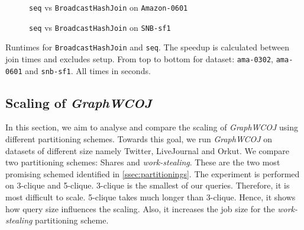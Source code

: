 \begin{figure}
    \centering
    
    \caption{\texttt{seq} vs \texttt{BroadcastHashJoin} on \texttt{Amazon-0601}}
    \label{fig:seq-bar-ama-0601}
\end{figure}

\begin{figure}
    \centering
    
    \caption{\texttt{seq} vs \texttt{BroadcastHashJoin} on \texttt{SNB-sf1}}
    \label{fig:seq-bar-snb-sf1}
\end{figure}

\begin{table}
    \centering

    
    \vspace{0.3cm}

    

    \vspace{0.3cm}
    
    \caption{Runtimes for \texttt{BroadcastHashJoin} and \texttt{seq}.
    The speedup is calculated between join times and excludes setup.
    From top to bottom for dataset: \texttt{ama-0302}, \texttt{ama-0601} and \texttt{snb-sf1}.
    All times in seconds.
    }
    \label{table:seq-vs-bhj}
\end{table}


\subsection{Scaling of \textit{Graph\textsc{WCOJ}}} \label{subsec:scaling-graphWCOJ}

In this section, we aim to analyse and compare the scaling of \textit{Graph\textsc{WCOJ}} using different
partitioning schemes.
Towards this goal, we run \textit{Graph\textsc{WCOJ}} on datasets of different size namely Twitter,
LiveJournal and Orkut.
We compare two partitioning schemes: Shares and \textit{work-stealing}.
These are the two most promising schemed identified in \cref{ssec:partitionings}.
The experiment is performed on 3-clique and 5-clique.
3-clique is the smallest of our queries.
Therefore, it is most difficult to scale.
5-clique takes much longer than 3-clique.
Hence, it shows how query size influences the scaling.
Also, it increases the job size for the \textit{work-stealing} partitioning scheme.


